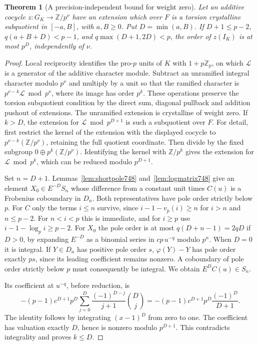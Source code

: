 \documentclass[a4paper,11pt]{article}
\newtheorem{theorem}[proposition]{Theorem}
\theoremstyle{definition}
\theoremstyle{remark}
\numberwithin{equation}{section}
\begin{document}
\begin{theorem}[A precision-independent bound for weight zero]
\leavevmode\label{thm:oldweightzero748}
Let an additive cocycle \(z:G_K\to\mathbb Z/p^\nu\) have an
extension which over \(F\) is a torsion crystalline subquotient
in \([-a,B]\), with \(a,B\ge0\). Put \(D=\min(a,B)\).
If \(D+1\le p-2\), \(q(a+B+D)<p-1\), and
\(q\max(D+1,2D)<p\), the order of \(z(I_K)\) is at most
\(p^D\), independently of \(\nu\).
\end{theorem}
\begin{proof}
Local reciprocity identifies the pro-\(p\) units of \(K\) with
\(1+p\mathbb Z_p\), on which \(\mathcal L\) is a generator of
the additive character module. Subtract an unramified integral
character modulo \(p^\nu\) and multiply by a unit so that the
ramified character is \(p^{\nu-k}\mathcal L\bmod p^\nu\), where
its image has order \(p^k\). These operations preserve the
torsion subquotient condition by the direct sum, diagonal pullback
and addition pushout of extensions. The unramified extension
is crystalline of weight zero. If \(k>D\), the extension for
\(\mathcal L\bmod p^{D+1}\) is such a subquotient over \(F\).
For detail, first restrict the kernel of the extension with
the displayed cocycle to \(p^{\nu-k}(\mathbb Z/p^\nu)\), retaining
the full quotient coordinate. Then divide by the fixed subgroup
\(0\oplus p^k(\mathbb Z/p^\nu)\). Identifying the kernel with
\(\mathbb Z/p^k\) gives the extension for
\(\mathcal L\bmod p^k\), which can be reduced modulo \(p^{D+1}\).

Set \(n=D+1\). Lemmas~\ref{lem:shortpole748}
and~\ref{lem:logmatrix748} give an element \(X_0\in E^{-D}S_n\)
whose difference from a constant unit times \(C(u)\) is a
Frobenius coboundary in \(D_n\). Both representatives have pole
order strictly below \(p\). For \(C\) only the terms \(i\le n\)
survive, since \(i-1-v_p(i)\ge n\) for \(i>n\) and \(n\le p-2\).
For \(n<i<p\) this is immediate, and for \(i\ge p\) use
\(i-1-\log_p i\ge p-2\). For \(X_0\) the pole order is at most
\(q(D+n-1)=2qD\) if \(D>0\), by expanding \(E^{-D}\) as a
binomial series in \(cp\,u^{-q}\) modulo \(p^n\). When \(D=0\)
it is integral. If \(Y\in D_n\) has positive pole order \(s\),
\(\varphi(Y)-Y\) has pole order exactly \(ps\), since its
leading coefficient remains nonzero. A coboundary of pole order
strictly below \(p\) must consequently be integral. We obtain
\(E^D C(u)\in S_n\).

Its coefficient at \(u^{-q}\), before reduction, is
\[
 -(p-1)c^{D+1}p^D
         \sum_{j=0}^{D}\frac{(-1)^{D-j}}{j+1}{D\choose j}
       =-(p-1)c^{D+1}p^D\frac{(-1)^D}{D+1}.
\]
The identity follows by integrating \((x-1)^D\) from zero
to one. The coefficient has valuation exactly \(D\), hence
is nonzero modulo \(p^{D+1}\). This contradicts integrality
and proves \(k\le D\).
\end{proof}
\end{document}

